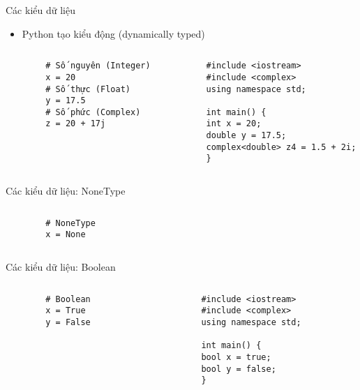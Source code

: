 \documentclass[10pt]{beamer}
\begin{document}
\begin{frame}[fragile]{Các kiểu dữ liệu}
  \begin{itemize}
    \item Python tạo kiểu động (dynamically typed)
  \end{itemize}
  \begin{columns}
    \begin{column}{0.4\textwidth}
      \begin{verbatim}
        # Số nguyên (Integer)
        x = 20
        # Số thực (Float)
        y = 17.5
        # Số phức (Complex)
        z = 20 + 17j
      \end{verbatim}
    \end{column}
    \begin{column}{0.7\textwidth}
      \begin{verbatim}
        #include <iostream>
        #include <complex>
        using namespace std;

        int main() {
        int x = 20;
        double y = 17.5;
        complex<double> z4 = 1.5 + 2i;
        }
      \end{verbatim}
    \end{column}
  \end{columns}
\end{frame}

\begin{frame}[fragile]{Các kiểu dữ liệu: NoneType}
  \begin{columns}
    \begin{column}{0.4\textwidth}
      \begin{verbatim}
        # NoneType
        x = None
      \end{verbatim}
    \end{column}

  \end{columns}
\end{frame}

\begin{frame}[fragile]{Các kiểu dữ liệu: Boolean}
  \begin{columns}
    \begin{column}{0.4\textwidth}
      \begin{verbatim}
        # Boolean
        x = True
        y = False
      \end{verbatim}
    \end{column}
    \begin{column}{0.7\textwidth}
      \begin{verbatim}
        #include <iostream>
        #include <complex>
        using namespace std;

        int main() {
        bool x = true;
        bool y = false;
        }
      \end{verbatim}
    \end{column}
  \end{columns}
\end{frame}
\end{document}
